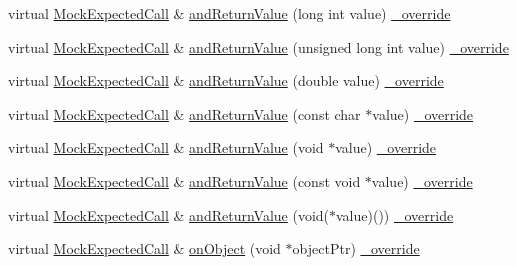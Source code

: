 \begin{DoxyCompactItemize}
\item 
virtual \hyperlink{class_mock_expected_call}{Mock\+Expected\+Call} \& \hyperlink{class_mock_expected_call_composite_ab66754505a335a2472e3f56fd97a0f26}{and\+Return\+Value} (long int value) \hyperlink{_cpp_u_test_config_8h_a049bea15dd750e15869863c94c1efc3b}{\+\_\+override}
\item 
virtual \hyperlink{class_mock_expected_call}{Mock\+Expected\+Call} \& \hyperlink{class_mock_expected_call_composite_a1e0fc04cbee3daeda422dfc66e938588}{and\+Return\+Value} (unsigned long int value) \hyperlink{_cpp_u_test_config_8h_a049bea15dd750e15869863c94c1efc3b}{\+\_\+override}
\item 
virtual \hyperlink{class_mock_expected_call}{Mock\+Expected\+Call} \& \hyperlink{class_mock_expected_call_composite_af0222bef246f6109d4aec64a6a703020}{and\+Return\+Value} (double value) \hyperlink{_cpp_u_test_config_8h_a049bea15dd750e15869863c94c1efc3b}{\+\_\+override}
\item 
virtual \hyperlink{class_mock_expected_call}{Mock\+Expected\+Call} \& \hyperlink{class_mock_expected_call_composite_a189034d88028fa407fe35118cbdc0792}{and\+Return\+Value} (const char $\ast$value) \hyperlink{_cpp_u_test_config_8h_a049bea15dd750e15869863c94c1efc3b}{\+\_\+override}
\item 
virtual \hyperlink{class_mock_expected_call}{Mock\+Expected\+Call} \& \hyperlink{class_mock_expected_call_composite_a39e510e812f80958ae95c5fe7f26bb7c}{and\+Return\+Value} (void $\ast$value) \hyperlink{_cpp_u_test_config_8h_a049bea15dd750e15869863c94c1efc3b}{\+\_\+override}
\item 
virtual \hyperlink{class_mock_expected_call}{Mock\+Expected\+Call} \& \hyperlink{class_mock_expected_call_composite_a9957e830f2f508b6ae9041043c4e08c7}{and\+Return\+Value} (const void $\ast$value) \hyperlink{_cpp_u_test_config_8h_a049bea15dd750e15869863c94c1efc3b}{\+\_\+override}
\item 
virtual \hyperlink{class_mock_expected_call}{Mock\+Expected\+Call} \& \hyperlink{class_mock_expected_call_composite_ab39bca67e06a448130ff59714349f4d7}{and\+Return\+Value} (void($\ast$value)()) \hyperlink{_cpp_u_test_config_8h_a049bea15dd750e15869863c94c1efc3b}{\+\_\+override}
\item 
virtual \hyperlink{class_mock_expected_call}{Mock\+Expected\+Call} \& \hyperlink{class_mock_expected_call_composite_a2b9a20c28455a98ea715a134776332fe}{on\+Object} (void $\ast$object\+Ptr) \hyperlink{_cpp_u_test_config_8h_a049bea15dd750e15869863c94c1efc3b}{\+\_\+override}
\item 

\end{DoxyCompactItemize}
